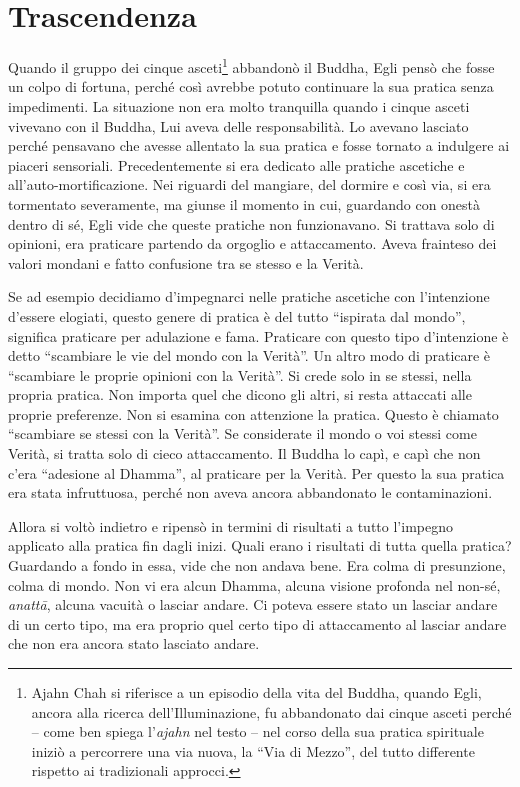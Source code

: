 \chapter{Trascendenza}

Quando il gruppo dei cinque asceti\footnote{Ajahn Chah si riferisce a un
  episodio della vita del Buddha, quando Egli, ancora alla ricerca
  dell'Illuminazione, fu abbandonato dai cinque asceti perché -- come
  ben spiega l'\emph{ajahn} nel testo -- nel corso della sua pratica
  spirituale iniziò a percorrere una via nuova, la ``Via di Mezzo'', del
  tutto differente rispetto ai tradizionali approcci.} abbandonò il
Buddha, Egli pensò che fosse un colpo di fortuna, perché così avrebbe
potuto continuare la sua pratica senza impedimenti. La situazione non
era molto tranquilla quando i cinque asceti vivevano con il Buddha, Lui
aveva delle responsabilità. Lo avevano lasciato perché pensavano che
avesse allentato la sua pratica e fosse tornato a indulgere ai piaceri
sensoriali. Precedentemente si era dedicato alle pratiche ascetiche e
all'auto-mortificazione. Nei riguardi del mangiare, del dormire e così
via, si era tormentato severamente, ma giunse il momento in cui,
guardando con onestà dentro di sé, Egli vide che queste pratiche non
funzionavano. Si trattava solo di opinioni, era praticare partendo da
orgoglio e attaccamento. Aveva frainteso dei valori mondani e fatto
confusione tra se stesso e la Verità.

Se ad esempio decidiamo d'impegnarci nelle pratiche ascetiche con
l'intenzione d'essere elogiati, questo genere di pratica è del tutto
``ispirata dal mondo'', significa praticare per adulazione e fama.
Praticare con questo tipo d'intenzione è detto ``scambiare le vie del
mondo con la Verità''. Un altro modo di praticare è ``scambiare le
proprie opinioni con la Verità''. Si crede solo in se stessi, nella
propria pratica. Non importa quel che dicono gli altri, si resta
attaccati alle proprie preferenze. Non si esamina con attenzione la
pratica. Questo è chiamato ``scambiare se stessi con la Verità''. Se
considerate il mondo o voi stessi come Verità, si tratta solo di cieco
attaccamento. Il Buddha lo capì, e capì che non c'era ``adesione al
Dhamma'', al praticare per la Verità. Per questo la sua pratica era
stata infruttuosa, perché non aveva ancora abbandonato le
contaminazioni.

Allora si voltò indietro e ripensò in termini di risultati a tutto
l'impegno applicato alla pratica fin dagli inizi. Quali erano i
risultati di tutta quella pratica? Guardando a fondo in essa, vide che
non andava bene. Era colma di presunzione, colma di mondo. Non vi era
alcun Dhamma, alcuna visione profonda nel non-sé, \emph{anattā}, alcuna
vacuità o lasciar andare. Ci poteva essere stato un lasciar andare di un
certo tipo, ma era proprio quel certo tipo di attaccamento al lasciar
andare che non era ancora stato lasciato andare.

